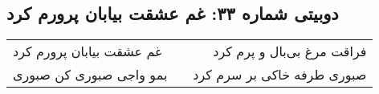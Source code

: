 \begin{center}
\section*{دوبیتی شماره ۳۳: غم عشقت بیابان پرورم کرد}
\label{sec:033}
\begin{longtable}{l p{0.5cm} r}
غم عشقت بیابان پرورم کرد
&&
فراقت مرغ بی‌بال و پرم کرد
\\
بمو واجی صبوری کن صبوری
&&
صبوری طرفه خاکی بر سرم کرد
\\
\end{longtable}
\end{center}

